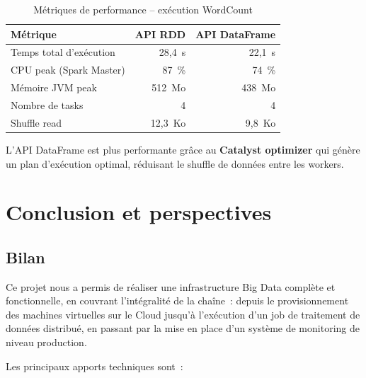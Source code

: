 \documentclass[12pt,a4paper,french]{report}
\newcommand{\kw}[1]{\textbf{#1}}
\begin{document}
\begin{table}[H]
\centering
\caption{Métriques de performance -- exécution WordCount}
\label{tab:perf}
\begin{tabular}{lrr}
\toprule
\textbf{Métrique} & \textbf{API RDD} & \textbf{API DataFrame} \\
\midrule
Temps total d'exécution & 28,4~s & 22,1~s \\
CPU peak (Spark Master) & 87~\% & 74~\% \\
Mémoire JVM peak & 512~Mo & 438~Mo \\
Nombre de tasks & 4 & 4 \\
Shuffle read & 12,3~Ko & 9,8~Ko \\
\bottomrule
\end{tabular}
\end{table}

L'API DataFrame est plus performante grâce au \kw{Catalyst optimizer} qui génère un plan d'exécution optimal, réduisant le shuffle de données entre les workers.

\chapter{Conclusion et perspectives}
\label{chap:conclusion}

\section{Bilan}

Ce projet nous a permis de réaliser une infrastructure Big Data complète et fonctionnelle, en couvrant l'intégralité de la chaîne~: depuis le provisionnement des machines virtuelles sur le Cloud jusqu'à l'exécution d'un job de traitement de données distribué, en passant par la mise en place d'un système de monitoring de niveau production.

Les principaux apports techniques sont~:
\end{document}
